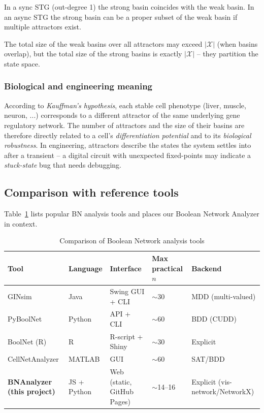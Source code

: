 \documentclass[oneside,final]{hcmut-report}
\begin{document}
In a sync STG (out-degree 1) the strong basin coincides with the weak basin. In an async STG the strong basin can be a proper subset of the weak basin if multiple attractors exist.

The total size of the weak basins over all attractors may exceed $|\mathcal{X}|$ (when basins overlap), but the total size of the strong basins is exactly $|\mathcal{X}|$ -- they partition the state space.

\subsubsection{Biological and engineering meaning}

According to \textit{Kauffman's hypothesis}, each stable cell phenotype (liver, muscle, neuron, ...) corresponds to a different attractor of the same underlying gene regulatory network. The number of attractors and the size of their basins are therefore directly related to a cell's \textit{differentiation potential} and to its \textit{biological robustness}. In engineering, attractors describe the states the system settles into after a transient -- a digital circuit with unexpected fixed-points may indicate a \textit{stuck-state} bug that needs debugging.

\subsection{Comparison with reference tools}\label{subsec:tools-compare}

Table~\ref{tab:tool-compare} lists popular BN analysis tools and places our Boolean Network Analyzer in context.

\begin{table}[H]
    \centering
    \renewcommand{\arraystretch}{1.3}
    \small
    \begin{tabular}{|p{}|p{}|p{}|p{}|p{}|}
        \hline
        \rowcolor{bklight}
        \textbf{Tool} & \textbf{Language} & \textbf{Interface} & \textbf{Max practical $n$} & \textbf{Backend} \\
        \hline
        GINsim \cite{naldi2009} & Java & Swing GUI + CLI & $\sim$30 & MDD (multi-valued) \\
        \hline
        PyBoolNet \cite{klarner2017pyboolnet} & Python & API + CLI & $\sim$60 & BDD (CUDD) \\
        \hline
        BoolNet (R) & R & R-script + Shiny & $\sim$30 & Explicit \\
        \hline
        CellNetAnalyzer & MATLAB & GUI & $\sim$60 & SAT/BDD \\
        \hline
        \textbf{BNAnalyzer (this project)} & JS + Python & Web (static, GitHub Pages) & $\sim$14--16 & Explicit (vis-network/NetworkX) \\
        \hline
    \end{tabular}
    \caption{Comparison of Boolean Network analysis tools}
    \label{tab:tool-compare}
\end{table}
\end{document}
